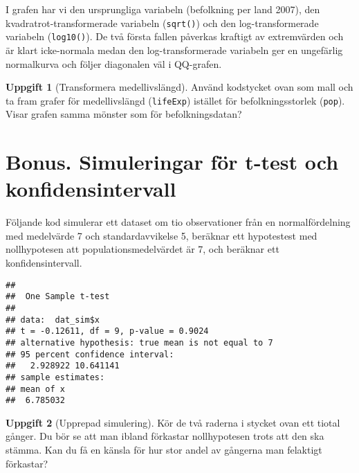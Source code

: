 \documentclass[
]{book}
\newenvironment{Shaded}{\begin{snugshade}}{\end{snugshade}}
\newcommand{\AttributeTok}[1]{\textcolor[rgb]{0.13,0.29,0.53}{#1}}
\newcommand{\DecValTok}[1]{\textcolor[rgb]{0.00,0.00,0.81}{#1}}
\newcommand{\FunctionTok}[1]{\textcolor[rgb]{0.13,0.29,0.53}{\textbf{#1}}}
\newcommand{\NormalTok}[1]{#1}
\newcommand{\OtherTok}[1]{\textcolor[rgb]{0.56,0.35,0.01}{#1}}
\newcommand{\SpecialCharTok}[1]{\textcolor[rgb]{0.81,0.36,0.00}{\textbf{#1}}}
\theoremstyle{definition}
\theoremstyle{definition}
\theoremstyle{definition}
\newtheorem{exercise}{Uppgift}[chapter]
\theoremstyle{definition}
\theoremstyle{remark}
\begin{document}
I grafen har vi den ursprungliga variabeln (befolkning per land 2007), den kvadratrot-transformerade variabeln (\texttt{sqrt()}) och den log-transformerade variabeln (\texttt{log10()}). De två första fallen påverkas kraftigt av extremvärden och är klart icke-normala medan den log-transformerade variabeln ger en ungefärlig normalkurva och följer diagonalen väl i QQ-grafen.

\begin{exercise}[Transformera medellivslängd]
Använd kodstycket ovan som mall och ta fram grafer för medellivslängd (\texttt{lifeExp}) istället för befolkningsstorlek (\texttt{pop}). Visar grafen samma mönster som för befolkningsdatan?
\end{exercise}

\hypertarget{bonus.-simuleringar-fuxf6r-t-test-och-konfidensintervall}{%
\section{Bonus. Simuleringar för t-test och konfidensintervall}\label{bonus.-simuleringar-fuxf6r-t-test-och-konfidensintervall}}

Följande kod simulerar ett dataset om tio observationer från en normalfördelning med medelvärde 7 och standardavvikelse 5, beräknar ett hypotestest med nollhypotesen att populationsmedelvärdet är 7, och beräknar ett konfidensintervall.

\begin{Shaded}
\end{Shaded}

\begin{verbatim}
## 
##  One Sample t-test
## 
## data:  dat_sim$x
## t = -0.12611, df = 9, p-value = 0.9024
## alternative hypothesis: true mean is not equal to 7
## 95 percent confidence interval:
##   2.928922 10.641141
## sample estimates:
## mean of x 
##  6.785032
\end{verbatim}

\begin{exercise}[Upprepad simulering]
Kör de två raderna i stycket ovan ett tiotal gånger. Du bör se att man ibland förkastar nollhypotesen trots att den ska stämma. Kan du få en känsla för hur stor andel av gångerna man felaktigt förkastar?
\end{exercise}
\end{document}
